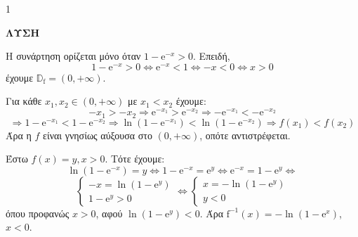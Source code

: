 \begin{ylh}{1}
    \item [Ύλη από εικόνα]
\end{ylh}
\large\textbf{ΛΥΣΗ}

\begin{alist}
\item Η συνάρτηση ορίζεται μόνο όταν $1-\mathrm{e}^{-x} > 0$. Επειδή,
\[ 1-\mathrm{e}^{-x} > 0 \Leftrightarrow \mathrm{e}^{-x} < 1 \Leftrightarrow -x < 0 \Leftrightarrow x > 0 \]
έχουμε $\mathbb{D}_\mathrm{f} = (0, +\infty)$.

Για κάθε $x_1, x_2 \in (0, +\infty)$ με $x_1 < x_2$ έχουμε:
\[ -x_1 > -x_2 \Rightarrow \mathrm{e}^{-x_1} > \mathrm{e}^{-x_2} \Rightarrow -\mathrm{e}^{-x_1} < -\mathrm{e}^{-x_2} \]
\[ \Rightarrow 1-\mathrm{e}^{-x_1} < 1-\mathrm{e}^{-x_2} \Rightarrow \ln(1-\mathrm{e}^{-x_1}) < \ln(1-\mathrm{e}^{-x_2}) \Rightarrow f(x_1) < f(x_2) \]
Άρα η $f$ είναι γνησίως αύξουσα στο $(0, +\infty)$, οπότε αντιστρέφεται.

\item Έστω $f(x)=y, x>0$. Τότε έχουμε:
\[ \ln(1-\mathrm{e}^{-x}) = y \Leftrightarrow 1-\mathrm{e}^{-x} = \mathrm{e}^{y} \Leftrightarrow \mathrm{e}^{-x} = 1-\mathrm{e}^{y} \Leftrightarrow \]
\[ \begin{cases}
-x = \ln(1-\mathrm{e}^{y}) \\
1-\mathrm{e}^{y} > 0
\end{cases}
\Leftrightarrow
\begin{cases}
x = -\ln(1-\mathrm{e}^{y}) \\
y < 0
\end{cases} \]
όπου προφανώς $x>0$, αφού $\ln(1-\mathrm{e}^{y}) < 0$. Άρα $\mathrm{f}^{-1}(x)=-\ln(1-\mathrm{e}^{x})$, $x<0$.
\end{alist}